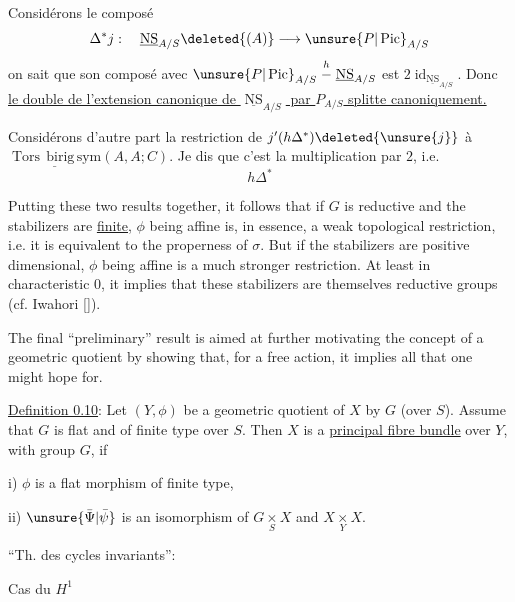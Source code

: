 Considérons le composé
\[
\Delta^*j:\quad\underline{\operatorname{NS}}_{A/S}\deleted{(A)}\longrightarrow\unsure{P|\operatorname{Pic}}_{A/S}
\]
on sait que son composé avec $\unsure{P|\operatorname{Pic}}_{A/S}\mathrel{\overset{h}{-}}\underline{\operatorname{NS}}_{A/S}$ est $2\operatorname{id}_{\underline{\operatorname{NS}}_{A/S}}$. Donc \uline{le double de l'extension canonique de $\underline{\operatorname{NS}}_{A/S}$ par $P_{A/S}$ splitte canoniquement.}


Considérons d'autre part la restriction de $j'(h\Delta^*)\deleted{\unsure{j}}$ à $\underline{\operatorname{Tors}\,\mathrm{birig}\,\mathrm{sym}}(A,A;C)$.
Je dis que c'est la multiplication par $2$, i.e.
\[
h\Delta^*
\]



Putting these two results together, it follows that if $G$ is reductive and the stabilizers are \uline{finite}, $\phi$ being affine is, in essence, a weak topological restriction, i.e. it is equivalent to the properness of $\sigma$. But if the stabilizers are positive dimensional, $\phi$ being affine is a much stronger restriction. At least in characteristic 0, it implies that these stabilizers are themselves reductive groups (cf. Iwahori [\quad]).

The final ``preliminary'' result is aimed at further motivating the concept of a geometric quotient by showing that, for a free action, it implies all that one might hope for.

\uline{Definition 0.10}: Let $(Y,\phi)$ be a geometric quotient of $X$ by $G$ (over $S$). Assume that $G$ is flat and of finite type over $S$. Then $X$ is a \uline{principal fibre bundle} over $Y$, with group $G$, if

\qquad i) $\phi$ is a flat morphism of finite type,

\qquad ii) $\unsure{\bar\Psi|\bar\psi}$ is an isomorphism of $G\mathbin{\underset{S}{\times}}X$ and $X\mathbin{\underset{Y}{\times}}X$.



``Th. des cycles invariants'':

Cas du $H^1$

